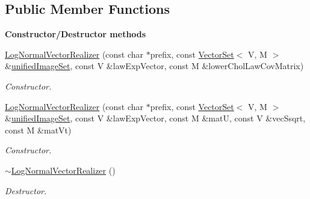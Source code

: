 \subsection*{Public Member Functions}
\begin{Indent}{\bf Constructor/\-Destructor methods}\par
\begin{DoxyCompactItemize}
\item 
\hyperlink{class_q_u_e_s_o_1_1_log_normal_vector_realizer_a155db70d5f9aee35d3f58cf5a5ae2f3f}{Log\-Normal\-Vector\-Realizer} (const char $\ast$prefix, const \hyperlink{class_q_u_e_s_o_1_1_vector_set}{Vector\-Set}$<$ V, M $>$ \&\hyperlink{class_q_u_e_s_o_1_1_base_vector_realizer_ad958991bab8d6369e8a0d66b22a237d4}{unified\-Image\-Set}, const V \&law\-Exp\-Vector, const M \&lower\-Chol\-Law\-Cov\-Matrix)
\begin{DoxyCompactList}\small\item\em Constructor. \end{DoxyCompactList}\item 
\hyperlink{class_q_u_e_s_o_1_1_log_normal_vector_realizer_a8e7ba3bee5bc42c44455c86d15400eb4}{Log\-Normal\-Vector\-Realizer} (const char $\ast$prefix, const \hyperlink{class_q_u_e_s_o_1_1_vector_set}{Vector\-Set}$<$ V, M $>$ \&\hyperlink{class_q_u_e_s_o_1_1_base_vector_realizer_ad958991bab8d6369e8a0d66b22a237d4}{unified\-Image\-Set}, const V \&law\-Exp\-Vector, const M \&mat\-U, const V \&vec\-Ssqrt, const M \&mat\-Vt)
\begin{DoxyCompactList}\small\item\em Constructor. \end{DoxyCompactList}\item 
\hyperlink{class_q_u_e_s_o_1_1_log_normal_vector_realizer_a581f1c3dbcb96ae5b74d33e6c50a28d3}{$\sim$\-Log\-Normal\-Vector\-Realizer} ()
\begin{DoxyCompactList}\small\item\em Destructor. \end{DoxyCompactList}\end{DoxyCompactItemize}
\end{Indent}
